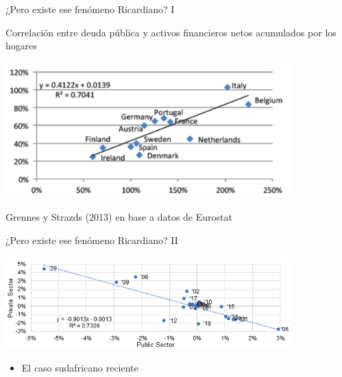 \documentclass{beamer}
\begin{document}
    




\begin{frame}{¿Pero existe ese fenómeno Ricardiano? I}

     \begin{center}
         Correlación entre deuda pública y activos financieros netos acumulados por los hogares
     \end{center}

     \centering\includegraphics[width=11cm]{P91b.png}\  

     \begin{center}
         Grennes y Strazds (2013) en base a datos de Eurostat
     \end{center}

\end{frame}


\begin{frame}{¿Pero existe ese fenómeno Ricardiano? II}

    

     \centering\includegraphics[width=11cm]{Figures/C36.11.png}\  
\begin{itemize}
    \item El caso sudafricano reciente
    \end{itemize}

\end{frame}
\end{document}
